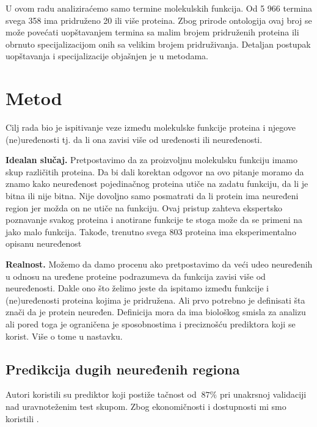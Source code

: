 U ovom radu analiziraćemo samo termine molekulskih funkcija.  Od 5 966 termina
svega 358 ima pridruženo 20 ili više proteina. Zbog prirode ontologija ovaj broj
se može povećati uopštavanjem termina sa malim brojem pridruženih proteina ili
obrnuto specijalizacijom onih sa velikim brojem pridruživanja. Detaljan postupak
uopštavanja i specijalizacije objašnjen je u metodama.


\section {Metod}

Cilj rada bio je ispitivanje veze između molekulske funkcije proteina i njegove
(ne)uređenosti tj.  da li ona zavisi više od uređenosti ili neuređenosti.

\textbf{Idealan slučaj.} 
Pretpostavimo da za proizvoljnu molekulsku funkciju imamo skup različitih
proteina.  Da bi dali korektan odgovor na ovo pitanje moramo da znamo kako
neuređenost pojedinačnog proteina utiče na zadatu funkciju, da li je bitna ili
nije bitna. Nije dovoljno samo posmatrati da li protein ima neuređeni region
jer možda on ne utiče na funkciju. Ovaj pristup zahteva ekspertsko poznavanje
svakog proteina i anotirane funkcije te stoga  može da se primeni na jako malo
funkcija. Takođe, trenutno svega 803 proteina ima eksperimentalno opisanu
neuređenost \parencite{disprot} 

\textbf{Realnost.} 
Možemo da damo procenu ako pretpostavimo da veći udeo neuređenih u odnosu na
uređene proteine podrazumeva da funkcija zavisi više od neuređenosti.  Dakle
ono što želimo jeste da ispitamo  između funkcije i
(ne)uređenosti proteina kojima je pridružena. Ali prvo potrebno je definisati
šta znači da je protein neuređen. Definicija mora da ima biološkog smisla za
analizu ali pored toga je ograničena je sposobnostima i preciznošću prediktora
koji se korist. Više o tome u nastavku.


\subsection{Predikcija dugih neuređenih regiona}

Autori \parencite{Xie2017} koristili su  prediktor koji
postiže tačnost od $~87\%$ pri unakrsnoj validaciji nad uravnoteženim test
skupom.  Zbog ekonomičnosti i dostupnosti mi smo koristili .

